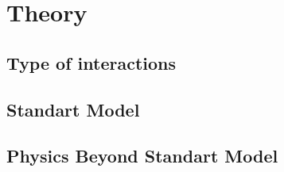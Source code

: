 \chapter{Theory}
\label{chap:Theory}



\section{Type of interactions}
\label{sec:typeOfInteractions}

\section{Standart Model}
\label{sec:standartModel}


\section{Physics Beyond Standart Model}
\label{sec:beyondStandartModel}

